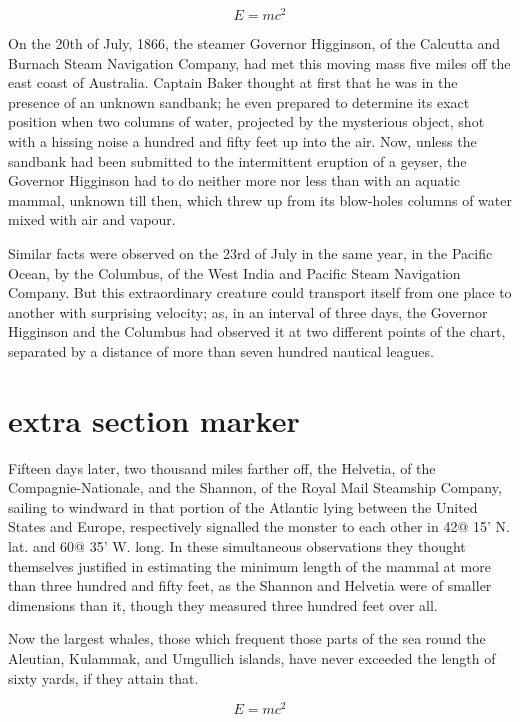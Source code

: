 \begin{equation}
E=mc^2
\end{equation}

On the 20th of July, 1866, the steamer Governor Higginson,
of the Calcutta and Burnach Steam Navigation Company, had met
this moving mass five miles off the east coast of Australia.
Captain Baker thought at first that he was in the presence of an
unknown sandbank; he even prepared to determine its exact position
when two columns of water, projected by the mysterious object,
shot with a hissing noise a hundred and fifty feet up into the air.
Now, unless the sandbank had been submitted to the intermittent
eruption of a geyser, the Governor Higginson had to do neither
more nor less than with an aquatic mammal, unknown till then,
which threw up from its blow-holes columns of water mixed with
air and vapour.\cite{inbook-full}\cite{book-full}

Similar facts were observed on the 23rd of July in the same year,
in the Pacific Ocean, by the Columbus, of the West India
and Pacific Steam Navigation Company.  But this extraordinary
creature could transport itself from one place to another
with surprising velocity; as, in an interval of three days,
the Governor Higginson and the Columbus had observed it at
two different points of the chart, separated by a distance
of more than seven hundred nautical leagues.

\section{extra section marker}

Fifteen days later, two thousand miles farther off, the Helvetia,
of the Compagnie-Nationale, and the Shannon, of the Royal
Mail Steamship Company, sailing to windward in that portion
of the Atlantic lying between the United States and Europe,
respectively signalled the monster to each other in 42@ 15' N. lat.
and 60@ 35' W. long.  In these simultaneous observations they
thought themselves justified in estimating the minimum length
of the mammal at more than three hundred and fifty feet,
as the Shannon and Helvetia were of smaller dimensions than it,
though they measured three hundred feet over all.

Now the largest whales, those which frequent those parts of the sea round
the Aleutian, Kulammak, and Umgullich islands, have never exceeded the length
of sixty yards, if they attain that.

\begin{equation}
E=mc^2
\end{equation}

